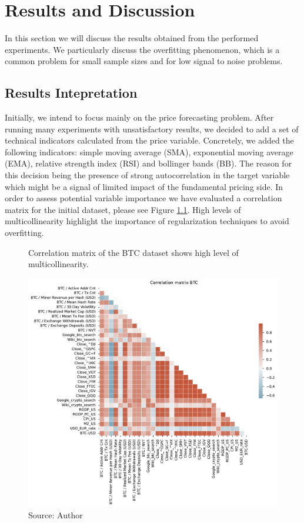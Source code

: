 \chapter{Results and Discussion}
\label{chap:five}
In this section we will discuss the results obtained from 
the performed experiments. We particularly discuss the 
overfitting phenomenon, which is a common problem
for small sample sizes and for low signal to noise problems. 


\section{Results Intepretation}
\label{sec:results}
Initially, we intend to focus mainly on the price forecasting problem.
After running many experiments with unsatisfactory results, we decided to add 
a set of technical indicators calculated from the price variable.
Concretely, we added the following indicators: simple moving average (SMA),
exponential moving average (EMA), relative strength index (RSI) and 
bollinger bands (BB). 
The reason for this decision being the presence
of strong autocorrelation in the target variable which
might be a signal of limited impact of the fundamental pricing side. 
In order to assess potential variable importance
we have evaluated a correlation matrix for the initial
dataset, please see Figure \ref{fig:Corr_btc}. High 
levels of multicollinearity highlight the importance of
regularization techniques to avoid overfitting.

\begin{figure}[!h]
    \centering
    \caption{Correlation matrix of the BTC dataset shows high level of 
    multicollinearity.}
    \includegraphics[width=1\textwidth]{Figures/Corr_btc.pdf}
    \caption*{Source: Author}
    \label{fig:Corr_btc}
\end{figure}

